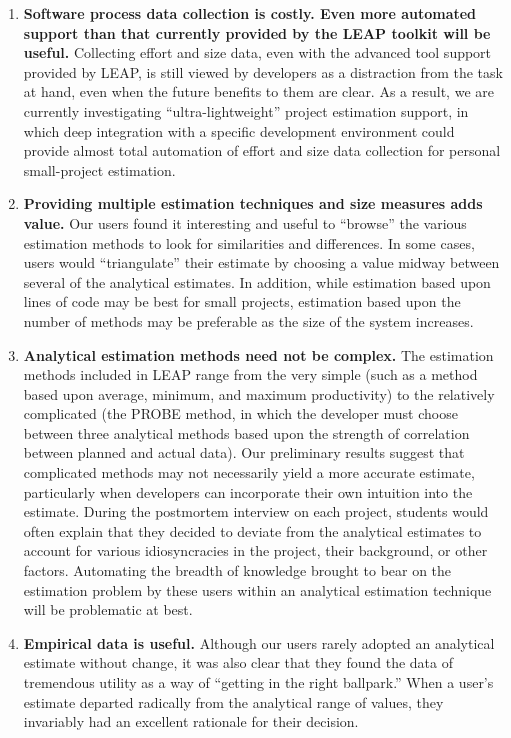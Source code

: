 \begin{enumerate}
  
\item {\bf Software process data collection is costly. Even more automated
support than that currently provided by the LEAP toolkit will be useful.}  Collecting effort and size data, even with the advanced
  tool support provided by LEAP, is still viewed by developers as a
  distraction from the task at hand, even when the future benefits to them
  are clear.  As a result, we are currently investigating
  ``ultra-lightweight'' project estimation support, in which deep
  integration with a specific development environment could provide almost
  total automation of effort and size data collection for personal
  small-project estimation. 

\item {\bf Providing multiple estimation techniques and size measures adds value.}
  Our users found it interesting and useful to ``browse'' the various
  estimation methods to look for similarities and differences. In some
  cases, users would ``triangulate'' their estimate by choosing a value
  midway between several of the analytical estimates.  In addition, while
  estimation based upon lines of code may be best for small projects,
  estimation based upon the number of methods may be preferable as the size
  of the system increases.
  
\item {\bf Analytical estimation methods need not be complex.}  The
  estimation methods included in LEAP range from the very simple (such as a
  method based upon average, minimum, and maximum productivity) to the
  relatively complicated (the PROBE method, in which the developer must
  choose between three analytical methods based upon the strength of
  correlation between planned and actual data).  Our preliminary results
  suggest that complicated methods may not necessarily yield a more
  accurate estimate, particularly when developers can incorporate their own
  intuition into the estimate.  During the postmortem interview on each
  project, students would often explain that they decided to deviate from the
  analytical estimates to account for various idiosyncracies in the
  project, their background, or other factors.  Automating the breadth of 
  knowledge brought to bear on the estimation problem by these users within 
  an analytical estimation technique will be problematic at best. 
  
\item {\bf Empirical data is useful.} Although our users
  rarely adopted an analytical estimate without change, it was also clear
  that they found the data of tremendous utility as a way of ``getting in
  the right ballpark.''  When a user's estimate departed radically from the
  analytical range of values, they invariably had an excellent rationale
  for their decision.
  

\end{enumerate}
